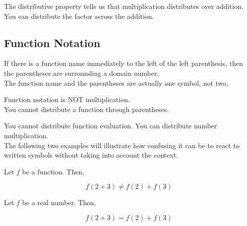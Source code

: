 \documentclass{ximera}
\begin{document}
The distributive property tells us that multiplication distributes over addition.  You can distribute the factor across the addition. \\

















\subsection{Function Notation}


If there is a function name immediately to the left of the left parenthesis, then the parentheses are surrounding a domain number.   \\


The function name and the parentheses are actually one symbol, not two. \\


\begin{warning}

Function notation is NOT multiplication. \\

You cannot distribute a function through parentheses.


\end{warning}

You cannot distribute function evaluation. You can distribute number multiplication. \\


The following two examples will illustrate how confusing it can be to react to written symbols without taking into account the context.  











\begin{example}


Let $f$ be a function.  Then, 


\[
f(2 + 3) \ne f(2) + f(3)
\]


\end{example}





\begin{example}


Let $f$ be a real number.  Then, 


\[
f(2 + 3) = f(2) + f(3)
\]


\end{example}
\end{document}
